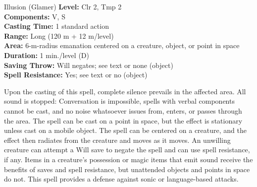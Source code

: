 {Illusion (Glamer)}
{
	\textbf{Level:}
	Clr 2, Tmp 2\\
	\textbf{Components:}
	V, S\\
	\textbf{Casting Time:}
	1 standard action\\
	\textbf{Range:}
	Long (120 m + 12 m/level)\\
	\textbf{Area:}
	6-m-radius emanation centered on a creature, object, or point in space\\
	\textbf{Duration:}
	1 min./level (D)\\
	\textbf{Saving Throw:}
	Will negates; see text or none (object)\\
	\textbf{Spell Resistance:}
	Yes; see text or no (object)\\
}
{
	Upon the casting of this spell, complete silence prevails in the affected area. All sound is stopped: Conversation is impossible, spells with verbal components cannot be cast, and no noise whatsoever issues from, enters, or passes through the area. The spell can be cast on a point in space, but the effect is stationary unless cast on a mobile object. The spell can be centered on a creature, and the effect then radiates from the creature and moves as it moves. An unwilling creature can attempt a Will save to negate the spell and can use spell resistance, if any. Items in a creature's possession or magic items that emit sound receive the benefits of saves and spell resistance, but unattended objects and points in space do not. This spell provides a defense against sonic or language-based attacks.

}
